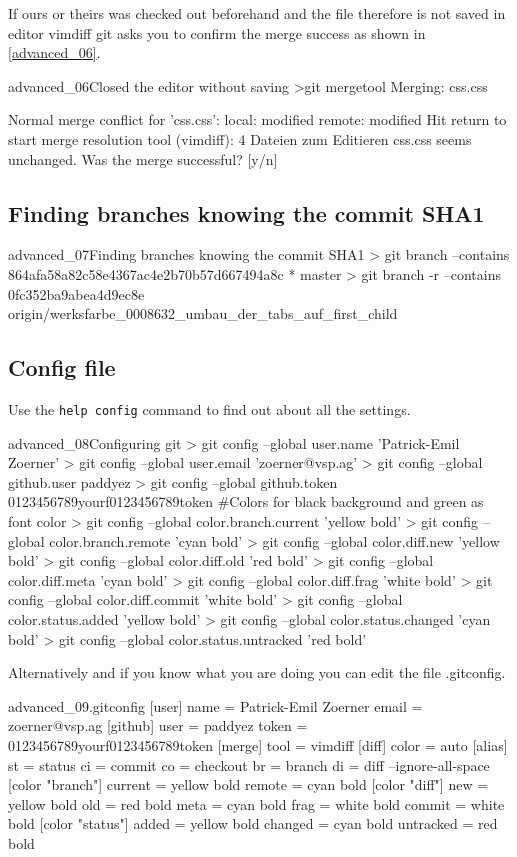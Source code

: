 If ours or theirs was checked out beforehand and the file therefore is not saved in editor vimdiff git asks you to confirm the merge success as shown in \ref{advanced_06}.
\begin{codelisting}{advanced_06}{Closed the editor without saving}
>git mergetool
Merging:
css.css

Normal merge conflict for 'css.css':
  {local}: modified
  {remote}: modified
Hit return to start merge resolution tool (vimdiff): 
4 Dateien zum Editieren
css.css seems unchanged.
Was the merge successful? [y/n]
\end{codelisting}
\subsection{Finding branches knowing the commit SHA1}
\begin{codelisting}{advanced_07}{Finding branches knowing the commit SHA1}
> git branch --contains 864afa58a82c58e4367ac4e2b70b57d667494a8c
* master
> git branch -r --contains 0fc352ba9abea4d9ec8e
  origin/werksfarbe_0008632_umbau_der_tabs_auf_first_child
\end{codelisting}
\subsection{Config file}
Use the \texttt{help config} command to find out about all the settings.
\begin{codelisting}{advanced_08}{Configuring git}
> git config --global user.name 'Patrick-Emil Zoerner'
> git config --global user.email 'zoerner@vsp.ag'
> git config --global github.user paddyez
> git config --global github.token 0123456789yourf0123456789token
#Colors for black background and green as font color
> git config --global color.branch.current 'yellow bold'
> git config --global color.branch.remote 'cyan bold'
> git config --global color.diff.new 'yellow bold'
> git config --global color.diff.old 'red bold'
> git config --global color.diff.meta 'cyan bold'
> git config --global color.diff.frag 'white bold'
> git config --global color.diff.commit 'white bold'
> git config --global color.status.added 'yellow bold'
> git config --global color.status.changed 'cyan bold'
> git config --global color.status.untracked 'red bold'
\end{codelisting}
Alternatively and if you know what you are doing you can edit the file .gitconfig.
\begin{codelisting}{advanced_09}{.gitconfig}
[user]
        name = Patrick-Emil Zoerner
        email = zoerner@vsp.ag
[github]
        user = paddyez
        token = 0123456789yourf0123456789token
[merge]
        tool = vimdiff
[diff]
        color = auto
[alias]
        st = status
        ci = commit
        co = checkout
        br = branch
        di = diff --ignore-all-space
[color "branch"]
        current = yellow bold
        remote = cyan bold
[color "diff"]
        new = yellow bold
        old = red bold
        meta = cyan bold
        frag = white bold
        commit = white bold
[color "status"]
        added = yellow bold
        changed = cyan bold
        untracked = red bold
\end{codelisting}
